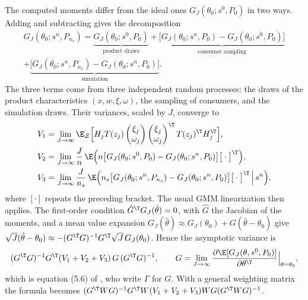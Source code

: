 The computed moments differ from the ideal ones $G_J(\theta_0; s^0, P_0)$ in two ways. Adding and subtracting
gives the decomposition
\begin{multline*}
  G_J(\theta_0; s^n, P_{n_s}) = \underbrace{G_J(\theta_0; s^0, P_0)}_{\text{product draws}}
  + \underbrace{\big[G_J(\theta_0; s^n, P_0) - G_J(\theta_0; s^0, P_0)\big]}_{\text{consumer sampling}}\\
  + \underbrace{\big[G_J(\theta_0; s^n, P_{n_s}) - G_J(\theta_0; s^n, P_0)\big]}_{\text{simulation}}.
\end{multline*}
The three terms come from three independent random processes: the draws of the product characteristics
$(x, w, \xi, \omega)$, the sampling of consumers, and the simulation draws. Their variances, scaled by $J$,
converge to
\begin{align*}
  V_1 &= \lim_{J\to\infty}\E_{\mathcal Z}\Big[H_j T(z_j)\begin{pmatrix}\xi_j\\ \omega_j\end{pmatrix}
  \begin{pmatrix}\xi_j\\ \omega_j\end{pmatrix}^\T T(z_j)^\T H_j^\T\Big],\\
  V_2 &= \lim_{J\to\infty}\frac{J}{n}\,\E\Big(n\big[G_J(\theta_0; s^0, P_0) - G_J(\theta_0; s^n,
  P_0)\big]\big[\cdot\big]^\T\Big),\\
  V_3 &= \lim_{J\to\infty}\frac{J}{n_s}\,\E\Big(n_s\big[G_J(\theta_0; s^n, P_{n_s}) - G_J(\theta_0; s^n,
  P_0)\big]\big[\cdot\big]^\T \,\Big|\, s^n\Big),
\end{align*}
where $[\cdot]$ repeats the preceding bracket. The usual GMM linearization then applies. The first-order
condition $\hat G^\T G_J(\hat\theta) = 0$, with $\hat G$ the Jacobian of the moments, and a mean value expansion
$G_J(\hat\theta) \approx G_J(\theta_0) + G(\hat\theta - \theta_0)$ give $\sqrt{J}(\hat\theta - \theta_0)
\approx -(G^\T G)^{-1}G^\T\sqrt{J}\,G_J(\theta_0)$. Hence the asymptotic variance is
\begin{equation}\label{eq:08-blp-avar}
  (G^\T G)^{-1}G^\T(V_1 + V_2 + V_3)\,G\,(G^\T G)^{-1}, \qquad G = \lim_{J\to\infty}\frac{\partial
  \E[G_J(\theta, s^0, P_0)]}{\partial \theta^\T}\Big|_{\theta = \theta_0},
\end{equation}
which is equation (5.6) of \citet{BerryLevinsohnPakes1995}, who write $\Gamma$ for $G$. With a general
weighting matrix the formula becomes $(G^\T WG)^{-1}G^\T W(V_1 + V_2 + V_3)WG(G^\T WG)^{-1}$.

